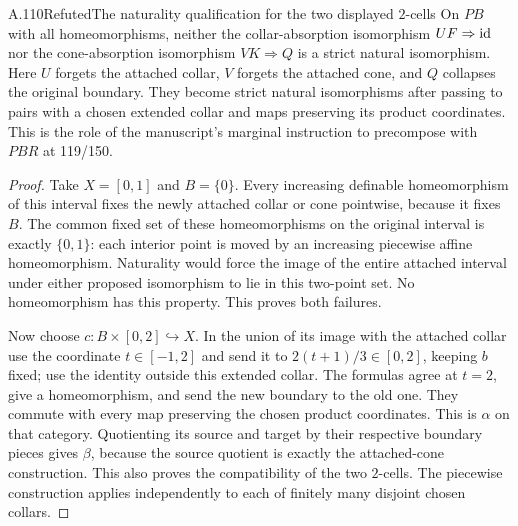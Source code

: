 \begin{saresult}{A.110}{Refuted}{The naturality qualification for the two displayed $2$-cells}
On $PB$ with all homeomorphisms, neither the collar-absorption
isomorphism $UF\Rightarrow\operatorname{id}$ nor the cone-absorption isomorphism
$VK\Rightarrow Q$ is a strict natural isomorphism. Here $U$ forgets
the attached collar, $V$ forgets the attached cone, and $Q$ collapses
the original boundary. They become strict natural isomorphisms after
passing to pairs with a chosen extended collar and maps preserving its
product coordinates. This is the role of the manuscript's marginal
instruction to precompose with $PBR$ at 119/150.
\end{saresult}
\begin{proof}
Take $X=[0,1]$ and $B=\{0\}$. Every increasing definable
homeomorphism of this interval fixes the newly attached collar or cone
pointwise, because it fixes $B$. The common fixed set of these
homeomorphisms on the original interval is exactly $\{0,1\}$:
each interior point is moved by an increasing piecewise affine
homeomorphism. Naturality would force the image of the entire attached
interval under either proposed isomorphism to lie in this two-point
set. No homeomorphism has this property. This proves both failures.

Now choose $c:B\times[0,2]\hookrightarrow X$. In the union of its
image with the attached collar use the coordinate $t\in[-1,2]$ and
send it to $2(t+1)/3\in[0,2]$, keeping $b$ fixed; use the identity
outside this extended collar. The formulas agree at $t=2$, give a
homeomorphism, and send the new boundary to the old one. They commute
with every map preserving the chosen product coordinates. This is
$\alpha$ on that category. Quotienting its source and target by their
respective boundary pieces gives $\beta$, because the source quotient
is exactly the attached-cone construction. This also proves the
compatibility of the two $2$-cells. The piecewise construction applies
independently to each of finitely many disjoint chosen collars.
\end{proof}

